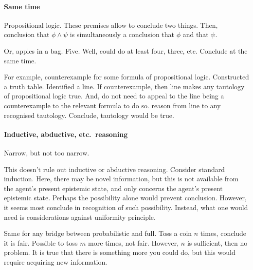 \paragraph*{Same time}

\begin{note}
  Propositional logic.
  These premises allow to conclude two things.
  Then, conclusion that \(\phi \land \psi\) is simultaneously a conclusion that \(\phi\) and that \(\psi\).

  Or, apples in a bag.
  Five.
  Well, could do at least four, three, etc.
  Conclude at the same time.
\end{note}

\begin{note}
  For example, counterexample for some formula of propositional logic.
  Constructed a truth table.
  Identified a line.
  If counterexample, then line makes any tautology of propositional logic true.
  And, do not need to appeal to the line being a counterexample to the relevant formula to do so.
  reason from line to any recognised tautology.
  Conclude, tautology would be true.
\end{note}

\paragraph*{Inductive, abductive, etc.\ reasoning}

\begin{note}
  Narrow, but not too narrow.
\end{note}

\begin{note}
  This doesn't rule out inductive or abductive reasoning.
  Consider standard induction.
  Here, there may be novel information, but this is not available from the agent's present epistemic state, and \qzS{} only concerns the agent's present epistemic state.
  Perhaps the possibility alone would prevent conclusion.
  However, it seems most conclude in recognition of such possibility.
  Instead, what one would need is considerations against uniformity principle.

  Same for any bridge between probabilistic and full.
  Toss a coin \(n\) times, conclude it is fair.
  Possible to toss \(m\) more times, not fair.
  However, \(n\) is sufficient, then no problem.
  It is true that there is something more you could do, but this would require acquiring new information.
\end{note}

